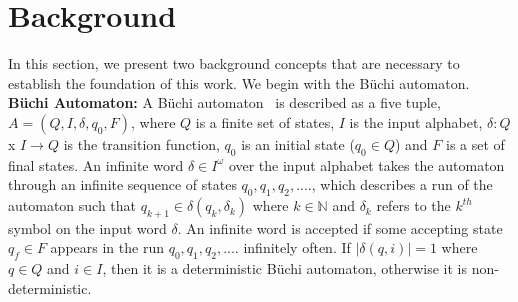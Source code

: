 \section{Background} \label{sec2}
\noindent
In this section, we present two background concepts that are necessary to establish the foundation of this work. We begin with the  
B\"{u}chi automaton. \\

\noindent
\textbf{B\"{u}chi Automaton:}
A B\"{u}chi automaton~\cite{leeuwen90/Thomas90} is described as a five tuple, 
$A = (Q,I,\delta,q_0,F)$, where $Q$ is a finite set of states, $I$ is the input alphabet, $\delta : Q$ x $I \rightarrow Q $ is the transition function, $q_0$ 
is an initial state ($q_0 \in Q$) and $F$ is a set of final states. An infinite word $\delta \in I ^ \omega$ over the input alphabet takes the automaton through an infinite sequence of states $ q_0, q_1, q_2, ....$, which describes a run of
the automaton such that $ q_{k+1} \in \delta(q_k, \delta_k)$ where $k \in \mathbb{N}$ and $\delta_k$ refers to the $k^{th}$ symbol on the input 
word $\delta$. An infinite word is accepted if some 
accepting state $q_f \in F $ appears in the run $ q_0, q_1, q_2, ....$ 
infinitely often. If 
$|\delta(q,i)| = 1$ where $ q \in Q $ and $i \in I$, then it is a deterministic 
B\"{u}chi automaton, otherwise it is non-deterministic. \\

\noindent


\noindent


\noindent


\noindent



